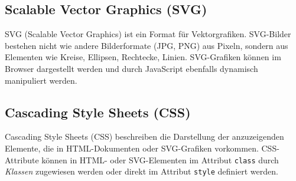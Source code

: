 \subsection{Scalable Vector Graphics (SVG)}

SVG (Scalable Vector Graphics) ist ein Format für Vektorgrafiken. SVG-Bilder bestehen nicht wie andere Bilderformate (JPG, PNG) aus Pixeln, sondern aus Elementen wie Kreise, Ellipsen, Rechtecke, Linien. SVG-Grafiken können im Browser dargestellt werden und durch JavaScript ebenfalls dynamisch manipuliert werden.

\subsection{Cascading Style Sheets (CSS)}

Cascading Style Sheets (CSS) beschreiben die Darstellung der anzuzeigenden Elemente, die in HTML-Dokumenten oder SVG-Grafiken vorkommen. CSS-Attribute können in HTML- oder SVG-Elementen im Attribut \lstinline[language=html]{class} durch \textit{Klassen} zugewiesen werden oder direkt im Attribut \lstinline[language=html]{style} definiert werden.